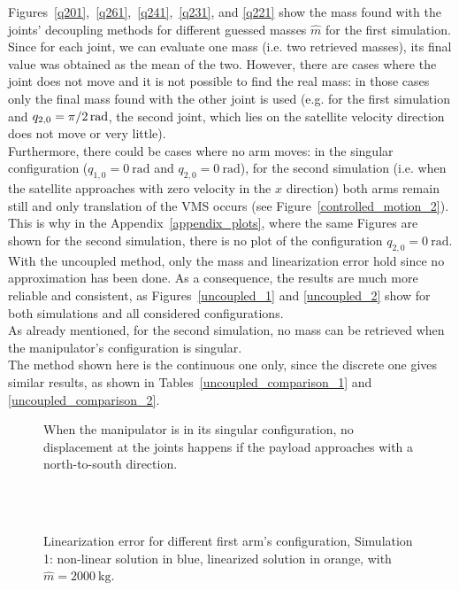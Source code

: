 \documentclass[a4paper,12pt,oneside]{report}
\begin{document}
Figures~\ref{q201},~\ref{q261},~\ref{q241},~\ref{q231}, and \ref{q221} show the mass found with the joints' decoupling methods for different guessed masses $\hat{m}$ for the first simulation. Since for each joint, we can evaluate one mass (i.e. two retrieved masses), its final value was obtained as the mean of the two. However, there are cases where the joint does not move and it is not possible to find the real mass: in those cases only the final mass found with the other joint is used (e.g. for the first simulation and $q_{2,0}=\SI[parse-numbers = false]{\pi/2}{\radian}$, the second joint, which lies on the satellite velocity direction does not move or very little).\\
Furthermore, there could be cases where no arm moves: in the singular configuration ($q_{1,0}=\SI{0}{\radian}$ and $q_{2,0}=\SI{0}{\radian}$), for the second simulation (i.e. when the satellite approaches with zero velocity in the $x$ direction) both arms remain still and only translation of the VMS occurs (see Figure~\ref{controlled_motion_2}). This is why in the Appendix~\ref{appendix_plots}, where the same Figures are shown for the second simulation, there is no plot of the configuration $q_{2,0}=\SI{0}{\radian}$.\\
With the uncoupled method, only the mass and linearization error hold since no approximation has been done. As a consequence, the results are much more reliable and consistent, as Figures~\ref{uncoupled_1} and \ref{uncoupled_2} show for both simulations and all considered configurations.\\
As already mentioned, for the second simulation, no mass can be retrieved when the manipulator's configuration is singular.\\
The method shown here is the continuous one only, since the discrete one gives similar results, as shown in Tables~\ref{uncoupled_comparison_1} and \ref{uncoupled_comparison_2}.
\begin{figure}
  \centering
  
  \caption{When the manipulator is in its singular configuration, no displacement at the joints happens if the payload approaches with a north-to-south direction.}
\end{figure}
\begin{figure}[h]
  \centering
  \subfloat[\emph{$q_{2,0}=\SI{0}{\radian}$}]{} \quad
  \subfloat[\emph{$q_{2,0}=\SI[parse-numbers = false]{\pi/6}{\radian}$}]{}\\
  \subfloat[\emph{$q_{2,0}=\SI[parse-numbers = false]{\pi/4}{\radian}$}]{}\quad
  \subfloat[\emph{$q_{2,0}=\SI[parse-numbers = false]{\pi/3}{\radian}$}]{}\\
  \subfloat[\emph{$q_{2,0}=\SI[parse-numbers = false]{\pi/2}{\radian}$}]{}
  \caption{Linearization error for different first arm's configuration, Simulation 1: non-linear solution in blue, linearized solution in orange, with $\hat{m}=\SI{2000}{\kilogram}$.}
  \label{linear_error_1}
\end{figure}
\end{document}
